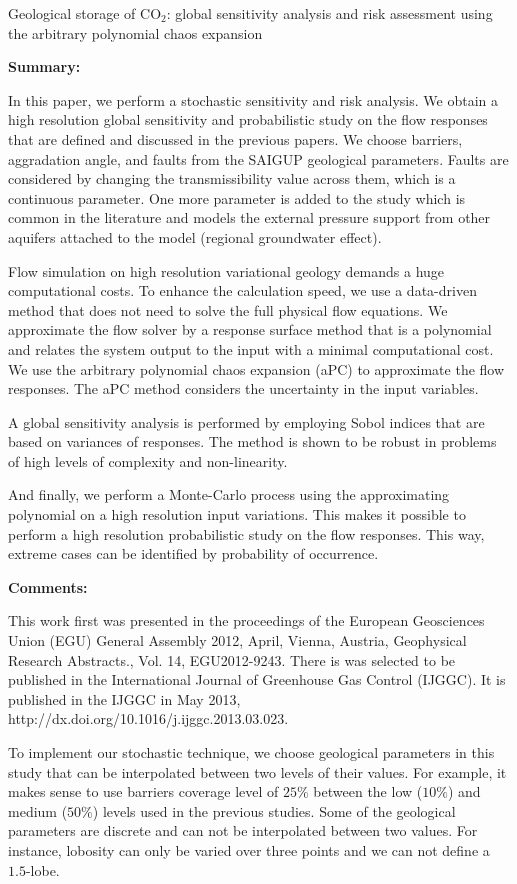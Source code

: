 {Geological storage of $\mbox{CO}_2$: global sensitivity analysis and risk
assessment using the arbitrary polynomial chaos expansion}
{\textbf{Summary:}

In this paper, we perform a stochastic sensitivity and risk analysis. We obtain
a high resolution global sensitivity and probabilistic study on the flow
responses that are defined and discussed in the previous papers. We choose
barriers, aggradation angle, and
faults from the SAIGUP geological parameters. Faults are considered by changing
the transmissibility value across them, which
is a continuous parameter. One more parameter is added to the study which is
common in the literature and models the external pressure support from other
aquifers attached to the model (regional groundwater effect).

Flow simulation on high resolution variational geology demands a huge
computational costs. To enhance the calculation speed, we use a data-driven
method that does not need to solve the full physical flow equations. We
approximate the flow solver by a response surface method that is a polynomial
and relates the system output to the input with a minimal computational cost.
We use the arbitrary polynomial chaos expansion (aPC) to approximate the
flow responses. The aPC method considers the uncertainty in the input variables.

A global sensitivity analysis is performed by employing Sobol indices that are
based on variances of responses. The method is shown to be robust in problems
of high levels of complexity and non-linearity.  

And finally, we perform a Monte-Carlo process using the approximating polynomial
on a high resolution input variations. This makes it possible to perform a high
resolution probabilistic study on the flow responses. This way, extreme cases
can be identified by probability of occurrence.

\vspace{0.5cm}
\noindent\textbf{Comments:}

This work first was presented in the proceedings of the European Geosciences Union (EGU) General Assembly 2012, April, Vienna, Austria, Geophysical Research Abstracts., Vol. 14, EGU2012-9243. There is was selected to be published in the International Journal of
Greenhouse Gas Control (IJGGC). It is published in the IJGGC in May 2013, http://dx.doi.org/10.1016/j.ijggc.2013.03.023.
 


To implement our stochastic technique, we choose geological parameters
in this study that can be interpolated between two levels of their values. For
example, it makes sense to use barriers coverage level of $25\%$ between the low
($10\%$) and medium ($50\%$) levels used in the previous studies. Some of the
geological parameters are discrete and can not be interpolated between two
values. For instance, lobosity can only be varied over three points and we can
not define a $1.5$-lobe. 

}
